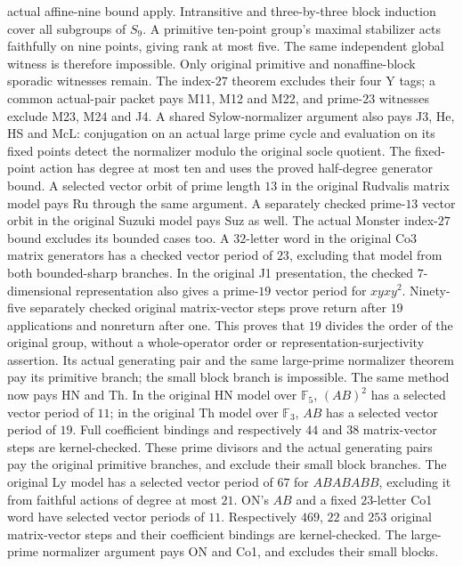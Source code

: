 actual affine-nine bound apply. Intransitive and three-by-three block
induction cover all subgroups of $S_9$. A primitive ten-point group's
maximal stabilizer acts faithfully on nine points, giving rank at most
five. The same independent global witness is therefore impossible.
Only original primitive and nonaffine-block sporadic witnesses remain.
The index-$27$ theorem excludes their four Y tags; a common actual-pair
packet pays M11, M12 and M22, and prime-$23$ witnesses exclude M23, M24
and J4. A shared Sylow-normalizer argument also pays J3, He, HS and McL:
conjugation on an actual large prime cycle and evaluation on its fixed
points detect the normalizer modulo the original socle quotient.
The fixed-point action has degree at most ten and uses the proved
half-degree generator bound. A selected vector orbit of prime length
$13$ in the original Rudvalis matrix model pays Ru through the same
argument. A separately checked prime-$13$ vector orbit in the original
Suzuki model pays Suz as well. The actual Monster index-$27$ bound
excludes its bounded cases too. A $32$-letter word in the original Co3
matrix generators has a checked vector period of $23$, excluding that
model from both bounded-sharp branches. In the original J1 presentation,
the checked $7$-dimensional representation also gives a prime-$19$ vector
period for $xyxy^2$. Ninety-five separately checked original matrix-vector
steps prove return after $19$ applications and nonreturn after one.
This proves that $19$ divides the order of the original group, without
a whole-operator order or representation-surjectivity assertion. Its
actual generating pair and the same large-prime normalizer theorem pay
its primitive branch; the small block branch is impossible. The same
method now pays HN and Th. In the original HN model over $\mathbb F_5$,
$(AB)^2$ has a selected vector period of $11$; in the original Th model
over $\mathbb F_3$, $AB$ has a selected vector period of $19$.
Full coefficient bindings and respectively $44$ and $38$ matrix-vector
steps are kernel-checked. These prime divisors and the actual generating
pairs pay the original primitive branches, and exclude their small block
branches. The original Ly model has a selected vector period of $67$
for $ABABABB$, excluding it from faithful actions of degree at most $21$.
ON's $AB$ and a fixed $23$-letter Co1 word have selected vector periods
of $11$. Respectively $469$, $22$ and $253$ original matrix-vector steps
and their coefficient bindings are kernel-checked. The large-prime
normalizer argument pays ON and Co1, and excludes their small blocks.
